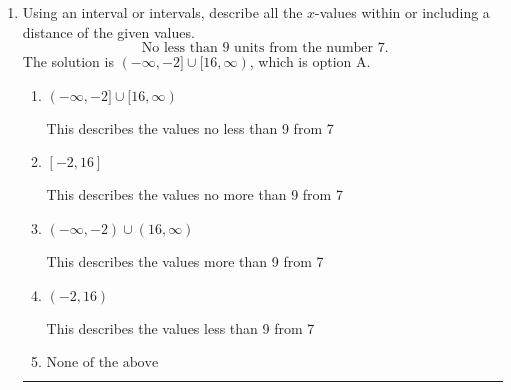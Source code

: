 \documentclass{extbook}[14pt]
\newcommand{\litem}[1]{\item #1

\rule{\textwidth}{0.4pt}}
\begin{document}
\begin{enumerate}
{\begin{enumerate}[label=\Alph*.]
$[11.00, -2.70)$, which is the correct interval but negatives of the actual endpoints.
\item \( (a, b], \text{ where } a \in [4.5, 13.5] \text{ and } b \in [-7.5, -2.25] \)

$(11.00, -2.70]$, which corresponds to flipping the inequality and getting negatives of the actual endpoints.
\item \( (-\infty, a) \cup [b, \infty), \text{ where } a \in [8.25, 13.5] \text{ and } b \in [-3.75, -1.5] \)

$(-\infty, 11.00) \cup [-2.70, \infty)$, which corresponds to displaying the and-inequality as an or-inequality AND flipping the inequality AND getting negatives of the actual endpoints.
\item \( (-\infty, a] \cup (b, \infty), \text{ where } a \in [8.25, 13.5] \text{ and } b \in [-5.25, -2.25] \)

$(-\infty, 11.00] \cup (-2.70, \infty)$, which corresponds to displaying the and-inequality as an or-inequality and getting negatives of the actual endpoints.
\item \( \text{None of the above.} \)

* This is correct as the answer should be $[-11.00, 2.70)$.
\end{enumerate}

\textbf{General Comment:} To solve, you will need to break up the compound inequality into two inequalities. Be sure to keep track of the inequality! It may be best to draw a number line and graph your solution.
}
\litem{
Using an interval or intervals, describe all the $x$-values within or including a distance of the given values.
\[ \text{ No less than } 9 \text{ units from the number } 7. \]The solution is \( (-\infty, -2] \cup [16, \infty) \), which is option A.\begin{enumerate}[label=\Alph*.]
\item \( (-\infty, -2] \cup [16, \infty) \)

This describes the values no less than 9 from 7
\item \( [-2, 16] \)

This describes the values no more than 9 from 7
\item \( (-\infty, -2) \cup (16, \infty) \)

This describes the values more than 9 from 7
\item \( (-2, 16) \)

This describes the values less than 9 from 7
\item \( \text{None of the above} \)


\end{enumerate}}
\end{enumerate}
\end{document}
